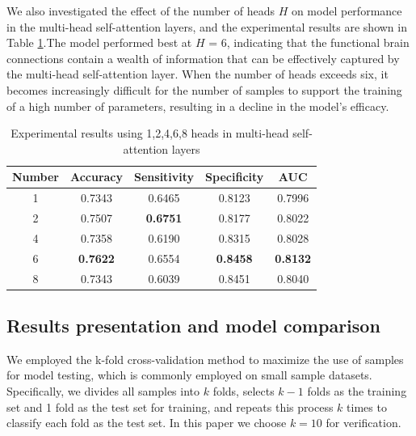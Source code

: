 \documentclass[a4paper]{cas-dc}
\begin{document}
We also investigated the effect of the number of heads $H$ on model performance in the multi-head self-attention layers, and the experimental results are shown in Table \ref{Table3}.The model performed best at $H$ = 6, indicating that the functional brain connections contain a wealth of information that can be effectively captured by the multi-head self-attention layer. When the number of heads exceeds six, it becomes increasingly difficult for the number of samples to support the training of a high number of parameters, resulting in a decline in the model's efficacy.
\begin{table}[]
	\caption{Experimental results using 1,2,4,6,8 heads in multi-head self-attention layers}\label{Table3}
	\begin{tabular*}{\tblwidth}{@{}ccccc@{}}
		\toprule
		\textbf{Number}& \textbf{Accuracy} & \textbf{Sensitivity} & \textbf{Specificity} & \textbf{AUC} \\ %
		\midrule
		1                            & 0.7343                & 0.6465                   & 0.8123                   & 0.7996           \\
		2                             & 0.7507                & \textbf{0.6751}          & 0.8177                   & 0.8022           \\
		4                             & 0.7358                & 0.6190                   & 0.8315                   & 0.8028           \\
		6                             & \textbf{0.7622}       & 0.6554                   & \textbf{0.8458}          & \textbf{0.8132}  \\
		8                             & 0.7343                & 0.6039                   & 0.8451                   & 0.8040      \\
		\bottomrule
	\end{tabular*}
\end{table}
\subsection{Results presentation and model comparison}
We employed the k-fold cross-validation method to maximize the use of samples for model testing, which is commonly employed on small sample datasets. Specifically, we divides all samples into $k$ folds, selects $k-1$ folds as the training set and 1 fold as the test set for training, and repeats this process $k$ times to classify each fold as the test set. In this paper we choose $k=10$ for verification.
\end{document}
